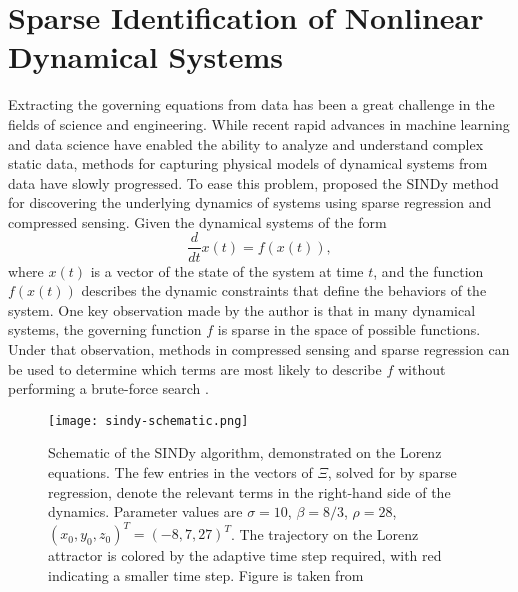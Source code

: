 \section{Sparse Identification of Nonlinear Dynamical Systems}

Extracting the governing equations from data has been a great challenge in the fields of science and engineering.
While recent rapid advances in machine learning and data science have enabled the ability to analyze and understand complex static data, methods for capturing physical models of dynamical systems from data have slowly progressed.
To ease this problem, \citeauthor{bruntonDiscoveringGoverningEquations2016} \cite{bruntonDiscoveringGoverningEquations2016} proposed the \gls{SINDy} method for discovering the underlying dynamics of systems using sparse regression and compressed sensing.
Given the dynamical systems of the form
\begin{equation*}
    \frac{d}{dt} x(t) = f(x(t)),
\end{equation*}
where $x(t)$ is a vector of the state of the system at time $t$, and the function $f(x(t))$ describes the dynamic constraints that define the behaviors of the system.
One key observation made by the author is that in many dynamical systems, the governing function $f$ is sparse in the space of possible functions.
Under that observation, methods in compressed sensing and sparse regression can be used to determine which terms are most likely to describe $f$ without performing a brute-force search \cite{bruntonDiscoveringGoverningEquations2016}.

\begin{figure}[h]
    \centering
    \texttt{[image: sindy-schematic.png]}
    \caption{Schematic of the SINDy algorithm, demonstrated on the Lorenz equations. The few entries in the vectors of $\Xi$, solved for by sparse regression, denote the relevant terms in the right-hand side of the dynamics. Parameter values are $\sigma = 10$, $\beta = 8/3$, $\rho = 28$, $(x_0 , y_0 , z_0)^T = (-8,7,27)^T$. The trajectory on the Lorenz attractor is colored by the adaptive time step required, with red indicating a smaller time step. Figure is taken from \citeauthor{bruntonDiscoveringGoverningEquations2016} \cite{bruntonDiscoveringGoverningEquations2016}}
    \label{fig:sindy-schematic}
\end{figure}

